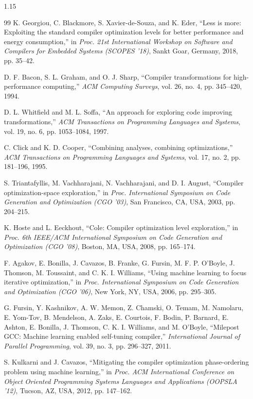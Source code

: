 \begin{spacing}{1.15}
\begin{thebibliography}{99}
 K. Georgiou, C. Blackmore, S. Xavier-de-Souza, and K. Eder, ``Less is more: Exploiting the standard compiler optimization levels for better performance and energy consumption,'' in \emph{Proc. 21st International Workshop on Software and Compilers for Embedded Systems (SCOPES '18)}, Sankt Goar, Germany, 2018, pp. 35--42.

 D. F. Bacon, S. L. Graham, and O. J. Sharp, ``Compiler transformations for high-performance computing,'' \emph{ACM Computing Surveys}, vol. 26, no. 4, pp. 345--420, 1994.

 D. L. Whitfield and M. L. Soffa, ``An approach for exploring code improving transformations,'' \emph{ACM Transactions on Programming Languages and Systems}, vol. 19, no. 6, pp. 1053--1084, 1997.

 C. Click and K. D. Cooper, ``Combining analyses, combining optimizations,'' \emph{ACM Transactions on Programming Languages and Systems}, vol. 17, no. 2, pp. 181--196, 1995.

 S. Triantafyllis, M. Vachharajani, N. Vachharajani, and D. I. August, ``Compiler optimization-space exploration,'' in \emph{Proc. International Symposium on Code Generation and Optimization (CGO '03)}, San Francisco, CA, USA, 2003, pp. 204--215.

 K. Hoste and L. Eeckhout, ``Cole: Compiler optimization level exploration,'' in \emph{Proc. 6th IEEE/ACM International Symposium on Code Generation and Optimization (CGO '08)}, Boston, MA, USA, 2008, pp. 165--174.

 F. Agakov, E. Bonilla, J. Cavazos, B. Franke, G. Fursin, M. F. P. O'Boyle, J. Thomson, M. Toussaint, and C. K. I. Williams, ``Using machine learning to focus iterative optimization,'' in \emph{Proc. International Symposium on Code Generation and Optimization (CGO '06)}, New York, NY, USA, 2006, pp. 295--305.

 G. Fursin, Y. Kashnikov, A. W. Memon, Z. Chamski, O. Temam, M. Namolaru, E. Yom-Tov, B. Mendelson, A. Zaks, E. Courtois, F. Bodin, P. Barnard, E. Ashton, E. Bonilla, J. Thomson, C. K. I. Williams, and M. O'Boyle, ``Milepost GCC: Machine learning enabled self-tuning compiler,'' \emph{International Journal of Parallel Programming}, vol. 39, no. 3, pp. 296--327, 2011.

 S. Kulkarni and J. Cavazos, ``Mitigating the compiler optimization phase-ordering problem using machine learning,'' in \emph{Proc. ACM International Conference on Object Oriented Programming Systems Languages and Applications (OOPSLA '12)}, Tucson, AZ, USA, 2012, pp. 147--162.


\end{thebibliography}
\end{spacing}
